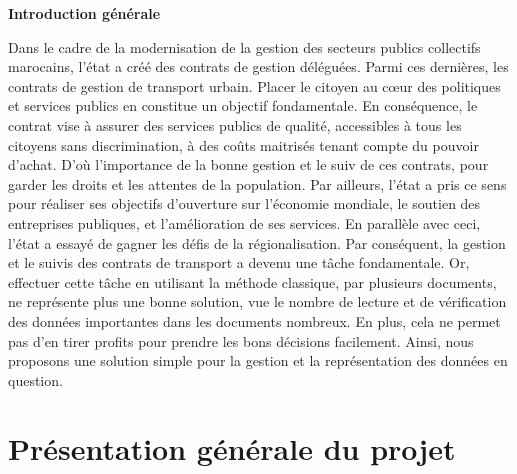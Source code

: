 \documentclass[a4paper]{report}
\begin{document}
\newpage
{}
\begin{doublespace}
    \begin{center}
        \vspace*{1cm}

        \textbf{\huge{Introduction générale}}

    \end{center}
\end{doublespace}
\begin{doublespace}
    \renewcommand{\headrulewidth}{1pt}
    \fancyhead[L]{\hspace*{5cm}}
    Dans le cadre de la modernisation de la gestion des secteurs publics collectifs
    marocains, l’état a créé des contrats de gestion déléguées. Parmi ces dernières, les
    contrats de gestion de transport urbain. Placer le citoyen au cœur des politiques et
    services publics en constitue un objectif fondamentale. En conséquence, le contrat
    vise à assurer des services publics de qualité, accessibles à tous les
    citoyens sans discrimination, à des coûts maitrisés tenant compte du pouvoir
    d’achat. D'où  l'importance de la bonne gestion et le suiv de ces contrats, pour garder
    les droits et les attentes de la population.
    Par ailleurs, l’état a pris ce sens pour réaliser ses objectifs d’ouverture sur l’économie
    mondiale, le soutien des entreprises publiques, et l’amélioration de ses services.
    En parallèle avec ceci, l’état a essayé de gagner les défis de la régionalisation.
    Par conséquent, la gestion et le suivis des contrats de transport a devenu une tâche
    fondamentale. Or, effectuer cette tâche en utilisant la méthode classique, par plusieurs documents,
    ne représente plus une bonne solution, vue le nombre de lecture et de vérification 
    des données importantes dans les documents nombreux. En plus, cela ne permet pas d’en
    tirer profits pour prendre les bons décisions facilement. Ainsi, nous proposons une
    solution simple pour la gestion et la représentation des données en question.
\end{doublespace}

\newpage

\chapter{Présentation générale du projet}
\end{document}

